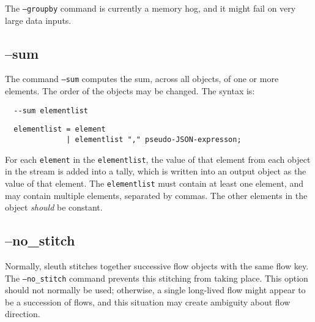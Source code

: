\documentclass{book}
\begin{document}
The \texttt{--groupby} command is currently a memory hog, and it might
fail on very large data inputs.

\subsection{--sum}
\label{sum}
The command \texttt{--sum} computes the sum, across all objects, of one or more
elements.  The order of the objects may be changed.  The syntax is:
\begin{verbatim}
  --sum elementlist
\end{verbatim}
\begin{verbatim}
  elementlist = element
              | elementlist "," pseudo-JSON-expresson;
\end{verbatim}
For each \texttt{element} in the \texttt{elementlist}, the value of
that element from each object in the stream is added into a tally,
which is written into an output object as the value of that element.
The \texttt{elementlist} must contain at least one element, and may
contain multiple elements, separated by commas.  The other elements in
the object \textit{should} be constant.
 
\subsection{--no\_stitch}
\label{nostitch}
Normally, sleuth stitches together successive flow objects with the
same flow key.  The \texttt{--no\_stitch} command prevents this
stitching from taking place.  This option should not normally be used;
otherwise, a single long-lived flow might appear to be a succession of
flows, and this situation may create ambiguity about flow direction.
\end{document}
